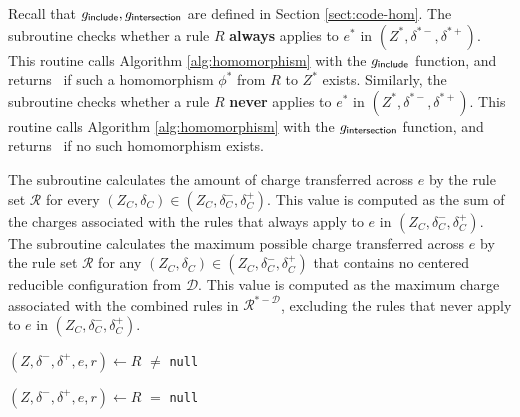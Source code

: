 \documentclass[main.tex]{subfiles}
\begin{document}
Recall that $g_\textsf{include}, g_\textsf{intersection}$ are defined in Section \ref{sect:code-hom}.
The \alwaysApply subroutine checks whether a rule $R$ {\bf always} applies to $e^*$ in $(Z^*, \delta^{*-}, \delta^{*+})$.
This routine calls Algorithm \ref{alg:homomorphism} with the $g_\textsf{include}$ function, and returns \True\ if such a homomorphism $\phi^*$ from $R$ to $Z^*$ exists.
Similarly, the \neverApply subroutine checks whether a rule $R$ {\bf never} applies to $e^*$ in $(Z^*, \delta^{*-}, \delta^{*+})$.
This routine calls Algorithm \ref{alg:homomorphism} with the $g_\textsf{intersection}$ function, and returns \True\ if no such homomorphism exists.

The \amountOfChargeSend subroutine calculates the amount of charge transferred across $e$ by the rule set $\mathcal{R}$ for every $(Z_C, \delta_C) \in (Z_C, \delta_C^-, \delta_C^+)$.
This value is computed as the sum of the charges associated with the rules that always apply to $e$ in $(Z_C, \delta_C^-, \delta_C^+)$.
The \amountOfPossibleChargeSend subroutine calculates the maximum possible charge transferred across $e$ by the rule set $\mathcal{R}$ for any $(Z_C, \delta_C) \in (Z_C, \delta_C^-, \delta_C^+)$ that contains no centered reducible configuration from $\mathcal{D}$.
This value is computed as the maximum charge associated with the combined rules in $\mathcal{R}^{*-\mathcal{D}}$, excluding the rules that never apply to $e$ in $(Z_C, \delta_C^-, \delta_C^+)$.

\begin{algorithm}[H]
    \caption{\alwaysApplyWithLink($(Z^*, \delta^{*-}, \delta^{*+}), e^*, R$)}
    \label{alg:ineivtably_apply}
    \begin{algorithmic}[1]
        \State $(Z, \delta^-, \delta^+, e, r) \gets R$
        \State \Return {} $\neq$ \texttt{null}
    \end{algorithmic}
\end{algorithm}


\begin{algorithm}[H]
    \caption{\neverApplyWithLink($(Z^*, \delta^{*-}, \delta^{*+}), e^*, R$)}
    \label{alg:never_apply}
    \begin{algorithmic}[1]
        \State $(Z, \delta^-, \delta^+, e, r) \gets R$
        \State \Return {} $=$ \texttt{null}
    \end{algorithmic}
\end{algorithm}
\end{document}
